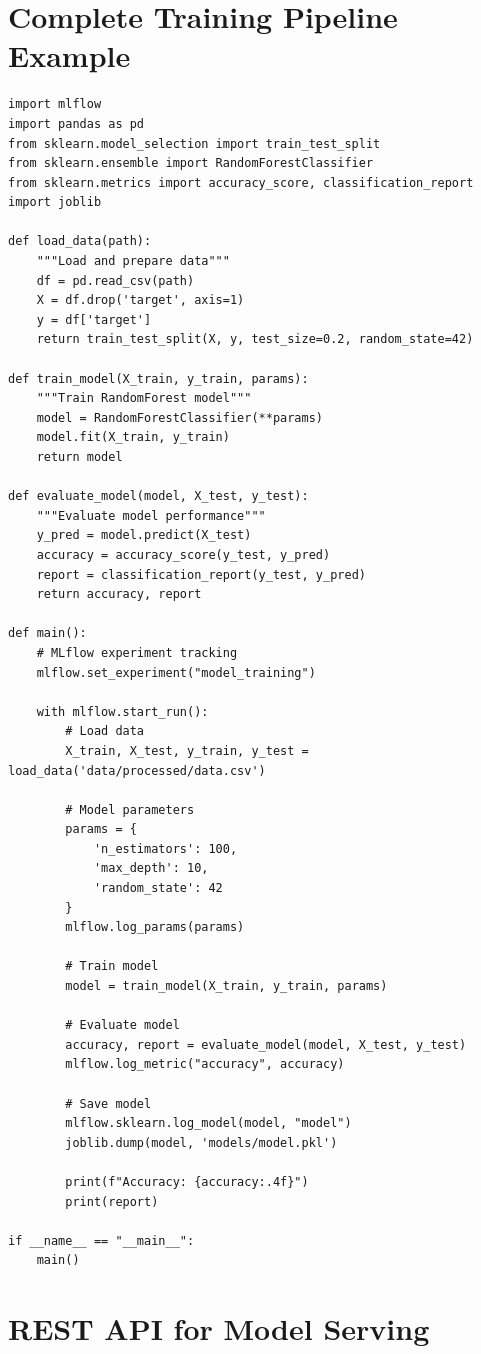\section{Complete Training Pipeline Example}

\begin{lstlisting}[style=python, caption=train\_pipeline.py]
import mlflow
import pandas as pd
from sklearn.model_selection import train_test_split
from sklearn.ensemble import RandomForestClassifier
from sklearn.metrics import accuracy_score, classification_report
import joblib

def load_data(path):
    """Load and prepare data"""
    df = pd.read_csv(path)
    X = df.drop('target', axis=1)
    y = df['target']
    return train_test_split(X, y, test_size=0.2, random_state=42)

def train_model(X_train, y_train, params):
    """Train RandomForest model"""
    model = RandomForestClassifier(**params)
    model.fit(X_train, y_train)
    return model

def evaluate_model(model, X_test, y_test):
    """Evaluate model performance"""
    y_pred = model.predict(X_test)
    accuracy = accuracy_score(y_test, y_pred)
    report = classification_report(y_test, y_pred)
    return accuracy, report

def main():
    # MLflow experiment tracking
    mlflow.set_experiment("model_training")

    with mlflow.start_run():
        # Load data
        X_train, X_test, y_train, y_test = load_data('data/processed/data.csv')

        # Model parameters
        params = {
            'n_estimators': 100,
            'max_depth': 10,
            'random_state': 42
        }
        mlflow.log_params(params)

        # Train model
        model = train_model(X_train, y_train, params)

        # Evaluate model
        accuracy, report = evaluate_model(model, X_test, y_test)
        mlflow.log_metric("accuracy", accuracy)

        # Save model
        mlflow.sklearn.log_model(model, "model")
        joblib.dump(model, 'models/model.pkl')

        print(f"Accuracy: {accuracy:.4f}")
        print(report)

if __name__ == "__main__":
    main()
\end{lstlisting}

\section{REST API for Model Serving}

